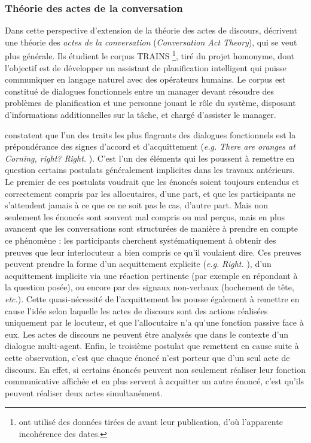 \documentclass[10pt,a4paper,twoside]{article}
\begin{document}
\subsubsection{Théorie des actes de la conversation}

Dans cette perspective d'extension de la théorie des actes de discours, \citet{traum1992conversation} décrivent une théorie des \textit{actes de la conversation} (\textit{Conversation Act Theory}), qui se veut plus générale. Ils étudient le corpus TRAINS \cite{gross1993trains}\footnote{\citeauthor{traum1992conversation} ont utilisé des données tirées de \cite{gross1993trains} avant leur publication, d'où l'apparente incohérence des dates.}, tiré du projet homonyme, dont l'objectif est de développer un assistant de planification intelligent qui puisse communiquer en langage naturel avec des opérateurs humains. Le corpus est constitué de dialogues fonctionnels entre un manager devant résoudre des problèmes de planification et une personne jouant le rôle du système, disposant d'informations additionnelles sur la tâche, et chargé d'assister le manager.

\citeauthor{traum1992conversation} constatent que l'un des traits les plus flagrants des dialogues fonctionnels est la prépondérance des signes d'accord et d'acquittement (\textit{e.g.} \textit{\og There are oranges at Corning, right? \fg{} \og Right. \fg}). C'est l'un des éléments qui les poussent à remettre en question certains postulats généralement implicites dans les travaux antérieurs. Le premier de ces postulats voudrait que les énoncés soient toujours entendus et correctement compris par les allocutaires, d'une part, et que les participants ne s'attendent jamais à ce que ce ne soit pas le cas, d'autre part. Mais non seulement les énoncés sont souvent mal compris ou mal perçus, mais en plus \citeauthor{traum1992conversation} avancent que les conversations sont structurées de manière à prendre en compte ce phénomène : les participants cherchent systématiquement à obtenir des preuves que leur interlocuteur a bien compris ce qu'il voulaient dire. Ces preuves peuvent prendre la forme d'un acquittement explicite (\textit{e.g.} \textit{\og Right. \fg}), d'un acquittement implicite via une réaction pertinente (par exemple en répondant à la question posée), ou encore par des signaux non-verbaux (hochement de tête, \textit{etc.}). Cette quasi-nécessité de l'acquittement les pousse également à remettre en cause l'idée selon laquelle les actes de discours sont des actions réalisées uniquement par le locuteur, et que l'allocutaire n'a qu'une fonction passive face à eux. Les actes de discours ne peuvent être analysés que dans le contexte d'un dialogue multi-agent. Enfin, le troisième postulat que \citeauthor{traum1992conversation} remettent en cause suite à cette observation, c'est que chaque énoncé n'est porteur que d'un seul acte de discours. En effet, si certains énoncés peuvent non seulement réaliser leur fonction communicative affichée et en plus servent à acquitter un autre énoncé, c'est qu'ils peuvent réaliser deux actes simultanément.
\end{document}
